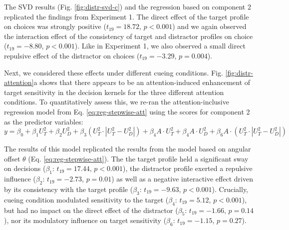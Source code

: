 \documentclass[a4paper, nobind]{templates/ociamthesis}
\begin{document}
The SVD results (Fig. \ref{fig:distr-svd-c}) and the regression based on component 2 replicated the findings from Experiment 1. The direct effect of the target profile on choices was strongly positive (\(t_{19}=18.72\), \(p<0.001\)) and we again observed the interaction effect of the consistency of target and distractor profiles on choice (\(t_{19}=-8.80\), \(p<0.001\)). Like in Experiment 1, we also observed a small direct repulsive effect of the distractor on choices (\(t_{19}=-3.29\), \(p=0.004\)).

Next, we considered these effects under different cueing conditions. Fig. \ref{fig:distr-attention}a shows that there appears to be an attention-induced enhancement of target sensitivity in the decision kernels for the three different attention conditions. To quantitatively assess this, we re-ran the attention-inclusive regression model from Eq. \eqref{eq:reg-stepwise-att} using the scores for component 2 as the predictor variables:
\begin{equation}
y = \beta_0 + \beta_1U_T^2 + \beta_2U_D^2 + \beta_3(U_T^2\cdot|U_T^2-U_D^2|) + \beta_4A\cdot U_T^2 + \beta_4A\cdot U_D^2 + \beta_6A\cdot(U_T^2\cdot|U_T^2-U_D^2|)
\label{eq:reg-svd-att}
\end{equation}

The results of this model replicated the results from the model based on angular offset \(\theta\) (Eq. \eqref{eq:reg-stepwise-att}). The the target profile held a significant sway on decisions (\(\beta_1\): \(t_{19}=17.44\), \(p<0.001\)), the distractor profile exerted a repulsive influence (\(\beta_2\): \(t_{19}=-2.73\), \(p=0.01\)) as well as a negative interactive effect driven by its consistency with the target profile (\(\beta_3\): \(t_{19}=-9.63\), \(p<0.001\)). Crucially, cueing condition modulated sensitivity to the target (\(\beta_4\): \(t_{19}=5.12\), \(p<0.001\)), but had no impact on the direct effect of the distractor (\(\beta_5\): \(t_{19}=-1.66\), \(p=0.14\)), nor its modulatory influence on target sensitivity (\(\beta_6\): \(t_{19}=-1.15\), \(p=0.27\)).
\end{document}
